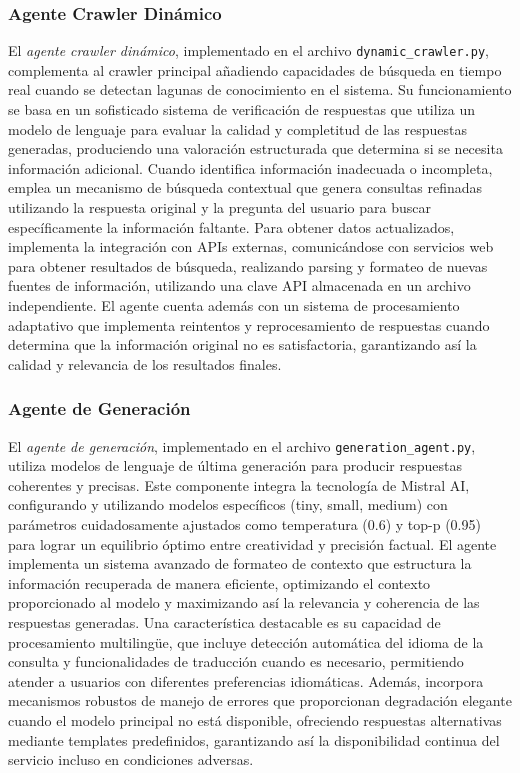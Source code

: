 \documentclass[runningheads]{llncs}
\begin{document}
\subsubsection{Agente Crawler Dinámico}
El \textit{agente crawler dinámico}, implementado en el archivo \texttt{dynamic\_crawler.py}, complementa al crawler principal añadiendo capacidades de búsqueda en tiempo real cuando se detectan lagunas de conocimiento en el sistema. Su funcionamiento se basa en un sofisticado sistema de verificación de respuestas que utiliza un modelo de lenguaje para evaluar la calidad y completitud de las respuestas generadas, produciendo una valoración estructurada que determina si se necesita información adicional. Cuando identifica información inadecuada o incompleta, emplea un mecanismo de búsqueda contextual que genera consultas refinadas utilizando la respuesta original y la pregunta del usuario para buscar específicamente la información faltante. Para obtener datos actualizados, implementa la integración con APIs externas, comunicándose con servicios web para obtener resultados de búsqueda, realizando parsing y formateo de nuevas fuentes de información, utilizando una clave API almacenada en un archivo independiente. El agente cuenta además con un sistema de procesamiento adaptativo que implementa reintentos y reprocesamiento de respuestas cuando determina que la información original no es satisfactoria, garantizando así la calidad y relevancia de los resultados finales.

\subsubsection{Agente de Generación}
El \textit{agente de generación}, implementado en el archivo \texttt{generation\_agent.py}, utiliza modelos de lenguaje de última generación para producir respuestas coherentes y precisas. Este componente integra la tecnología de Mistral AI, configurando y utilizando modelos específicos (tiny, small, medium) con parámetros cuidadosamente ajustados como temperatura (0.6) y top-p (0.95) para lograr un equilibrio óptimo entre creatividad y precisión factual. El agente implementa un sistema avanzado de formateo de contexto que estructura la información recuperada de manera eficiente, optimizando el contexto proporcionado al modelo y maximizando así la relevancia y coherencia de las respuestas generadas. Una característica destacable es su capacidad de procesamiento multilingüe, que incluye detección automática del idioma de la consulta y funcionalidades de traducción cuando es necesario, permitiendo atender a usuarios con diferentes preferencias idiomáticas. Además, incorpora mecanismos robustos de manejo de errores que proporcionan degradación elegante cuando el modelo principal no está disponible, ofreciendo respuestas alternativas mediante templates predefinidos, garantizando así la disponibilidad continua del servicio incluso en condiciones adversas.
\end{document}
